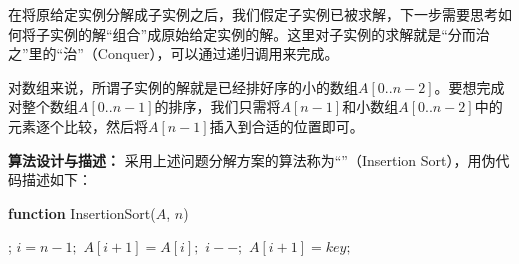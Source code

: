     在将原给定实例分解成子实例之后，我们假定子实例已被求解，下一步需要思考如何将子实例的解“组合”成原始给定实例的解。这里对子实例的求解就是“分而治之”里的“治”（Conquer），可以通过递归调用来完成。
    
    对数组来说，所谓子实例的解就是已经排好序的小的数组$A[0..n-2]$。要想完成对整个数组$A[0..n-1]$的排序，我们只需将$A[n-1]$和小数组$A[0..n-2]$中的元素逐个比较，然后将$A[n-1]$插入到合适的位置即可。
    
 {\bf 算法设计与描述：} 
 	采用上述问题分解方案的算法称为“”（Insertion Sort），用伪代码描述如下：
   
\begin{algorithm}[H]
\caption{{\sc InsertionSort} algorithm}\label{InsertionSortAlgo} 
{\bf function} {\sc InsertionSort}($A$, $n$) 
\begin{algorithmic}[1]	
	\RETURN{;}
\ELSE	
	; 
	\STATE $i = n - 1;$
		\STATE $A[i+1] = A[i];$ 
		\STATE $i--;$
	\ENDWHILE
	\STATE $A[i+1] = key;$
\ENDIF
\end{algorithmic}
\end{algorithm}
	

